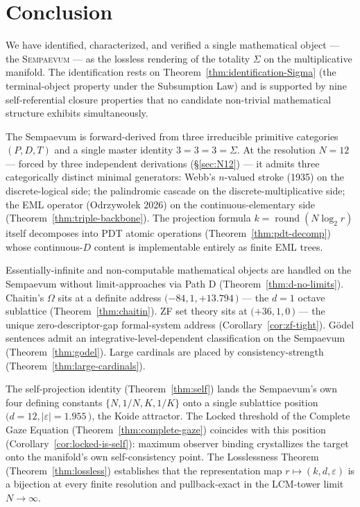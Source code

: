 \documentclass[11pt,a4paper]{article}
\theoremstyle{definition}
\theoremstyle{remark}
\DeclareMathOperator{\round}{round}
\newcommand{\Sempaevum}{\textnormal{\textsc{Sempaevum}}}
\begin{document}
\section{Conclusion}\label{sec:conclusion}

We have identified, characterized, and verified a single mathematical object --- the \Sempaevum{} --- as the lossless rendering of the totality $\Sigma$ on the multiplicative manifold. The identification rests on Theorem~\ref{thm:identification-Sigma} (the terminal-object property under the Subsumption Law) and is supported by nine self-referential closure properties that no candidate non-trivial mathematical structure exhibits simultaneously.

The Sempaevum is forward-derived from three irreducible primitive categories $(P,D,T)$ and a single master identity $3=3=3=\Sigma$. At the resolution $N=12$ --- forced by three independent derivations (\S\ref{sec:N12}) --- it admits three categorically distinct minimal generators: Webb's $n$-valued stroke (1935) on the discrete-logical side; the palindromic cascade on the discrete-multiplicative side; the EML operator (Odrzywo{\l}ek 2026) on the continuous-elementary side (Theorem~\ref{thm:triple-backbone}). The projection formula $k=\round(N\log_{2}r)$ itself decomposes into PDT atomic operations (Theorem~\ref{thm:pdt-decomp}) whose continuous-$D$ content is implementable entirely as finite EML trees.

Essentially-infinite and non-computable mathematical objects are handled on the Sempaevum without limit-approaches via Path D (Theorem~\ref{thm:d-no-limits}). Chaitin's $\Omega$ sits at a definite address $(-84, 1, +13.794$\,\textcent$)$ --- the $d=1$ octave sublattice (Theorem~\ref{thm:chaitin}). ZF set theory sits at $(+36, 1, 0$\,\textcent$)$ --- the unique zero-descriptor-gap formal-system address (Corollary~\ref{cor:zf-tight}). G\"odel sentences admit an integrative-level-dependent classification on the Sempaevum (Theorem~\ref{thm:godel}). Large cardinals are placed by consistency-strength (Theorem~\ref{thm:large-cardinals}).

The self-projection identity (Theorem~\ref{thm:self}) lands the Sempaevum's own four defining constants $\{N, 1/N, K, 1/K\}$ onto a single sublattice position $(d=12, |\varepsilon|=1.955$\,\textcent$)$, the Koide attractor. The Locked threshold of the Complete Gaze Equation (Theorem~\ref{thm:complete-gaze}) coincides with this position (Corollary~\ref{cor:locked-is-self}): maximum observer binding crystallizes the target onto the manifold's own self-consistency point. The Losslessness Theorem (Theorem~\ref{thm:lossless}) establishes that the representation map $r\mapsto(k,d,\varepsilon)$ is a bijection at every finite resolution and pullback-exact in the LCM-tower limit $N\to\infty$.
\end{document}
